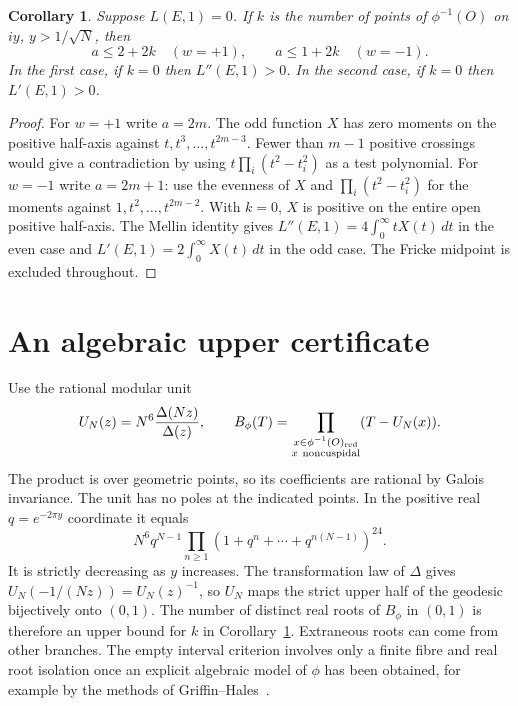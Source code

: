 \documentclass[11pt]{article}
\newtheorem{corollary}[theorem]{Corollary}
\begin{document}
\begin{corollary}\label{cor:half}
Suppose $L(E,1)=0$. If $k$ is the number of points of
$\phi^{-1}(O)$ on $iy$, $y>1/\sqrt N$, then
\[
 a\le 2+2k\quad(w=+1),\qquad a\le 1+2k\quad(w=-1).
\]
In the first case, if $k=0$ then $L''(E,1)>0$. In the second case,
if $k=0$ then $L'(E,1)>0$.
\end{corollary}
\begin{proof}
For $w=+1$ write $a=2m$. The odd function $X$ has zero moments on
the positive half-axis against $t,t^3,\ldots,t^{2m-3}$. Fewer than
$m-1$ positive crossings would give a contradiction by using
$t\prod_i(t^2-t_i^2)$ as a test polynomial. For $w=-1$ write $a=2m+1$:
use the evenness of $X$ and $\prod_i(t^2-t_i^2)$ for the moments
against $1,t^2,\ldots,t^{2m-2}$. With $k=0$, $X$ is positive
on the entire open positive half-axis. The Mellin identity gives
$L''(E,1)=4\int_0^\infty tX(t)\,dt$ in the even case and
$L'(E,1)=2\int_0^\infty X(t)\,dt$ in the odd case. The Fricke
midpoint is excluded throughout.
\end{proof}

\section*{An algebraic upper certificate}
Use the rational modular unit
\[
 U_N(z)=N^6\frac{\Delta(Nz)}{\Delta(z)},\qquad
 B_\phi(T)=\prod_{\substack{x\in\phi^{-1}(O)_{\mathrm{red}}\\
                             x\ {\rm noncuspidal}}}(T-U_N(x)).
\]
The product is over geometric points, so its coefficients are rational
by Galois invariance. The unit has no poles at the indicated points.
In the positive real $q=e^{-2\pi y}$ coordinate it equals
\[
 N^6q^{N-1}\prod_{n\ge1}(1+q^n+\cdots+q^{n(N-1)})^{24}.
\]
It is strictly decreasing as $y$ increases. The transformation law of
$\Delta$ gives $U_N(-1/(Nz))=U_N(z)^{-1}$, so $U_N$ maps the
strict upper half of the geodesic bijectively onto $(0,1)$.
The number of distinct real roots of $B_\phi$ in $(0,1)$ is therefore
an upper bound for $k$ in Corollary~\ref{cor:half}. Extraneous roots
can come from other branches. The empty interval criterion involves
only a finite fibre and real root isolation once an explicit algebraic
model of $\phi$ has been obtained, for example by the methods
of Griffin--Hales~\cite{GH}.
\end{document}
